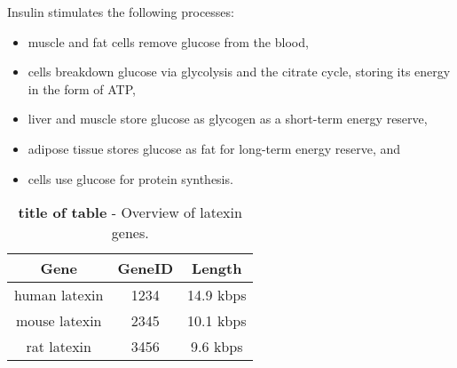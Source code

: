 




Insulin stimulates the following processes:

\begin{itemize}
\item muscle and fat cells remove glucose from the blood,
\item cells breakdown glucose via glycolysis and the citrate cycle, storing its energy in the form of ATP,
\item liver and muscle store glucose as glycogen as a short-term energy reserve,
\item adipose tissue stores glucose as fat for long-term energy reserve, and
\item cells use glucose for protein synthesis.
\end{itemize}



 



\begin{table}[htp]
\centering
\begin{tabular}{ccc} %

{\bf Gene} & {\bf GeneID} & {\bf Length} \\ 
\hline %

human latexin & 1234 & 14.9 kbps \\
mouse latexin & 2345 & 10.1 kbps \\
rat latexin   & 3456 & 9.6 kbps \\

\end{tabular}
\caption[title of table]{\textbf{title of table} - Overview of latexin genes.}
\label{latexin_genes} %
\end{table}








